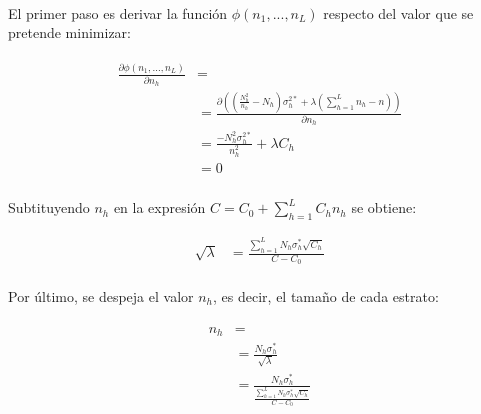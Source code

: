 \documentclass{article}
\begin{document}
      \paragraph{}
      El primer paso es derivar la función $\phi(n_1, ..., n_L)$ respecto del valor que se pretende minimizar:

      \begin{align}
      \label{eq:derivate_2}
        \begin{split}
          \frac{\partial \phi(n_1, ..., n_L)}{\partial n_h} &= \\
          &= \frac{\partial\left( \left(\frac{N_h^2}{n_h}- N_h\right)\sigma_h^{2*}
          + \lambda \left( \sum\limits_{h=1}^L n_h - n\right)\right) }{\partial n_h} \\
          &= \frac{-N_h^2 \sigma_h^{2*}}{n_h^2} +\lambda C_h\\
          &= 0
        \end{split}
      \end{align}

      \paragraph{}
      Subtituyendo $n_h$ en la expresión $C = C_0 + \sum\limits_{h=1}^LC_hn_h$ se obtiene:

      \begin{align}
        \sqrt{\lambda} &= \frac{\sum\limits_{h=1}^L N_h \sigma_h^{*} \sqrt{C_h} }{C - C_0}
      \end{align}

      \paragraph{}
      Por último, se despeja el valor $n_h$, es decir, el tamaño de cada estrato:

      \begin{align}
        \begin{split}
          n_h &= \\
          &= \frac{N_h \sigma_h^{*}}{\sqrt{\lambda}}\\
          &= \frac{N_h \sigma_h^{*}}{\frac{\sum\limits_{h=1}^L N_h \sigma_h^{*} \sqrt{C_h} }{C - C_0}}
        \end{split}
      \end{align}



  \nocite{muest2017}
  \nocite{sarndal2003model}

  
  
\end{document}
